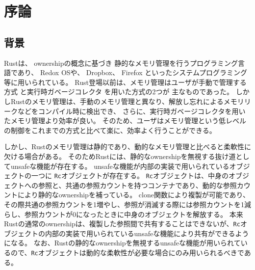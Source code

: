 \documentclass{sumiilab-paper}
\theoremstyle{mystyle}
\numberwithin{definition}{chapter} %
\begin{document}
\tableofcontents%

\mainmatter%

\chapter{序論}
\section{背景}
Rust\cite{DBLP:conf/sigada/MatsakisK14, rust-web, rust-book}は、
ownership\cite{DBLP:conf/oopsla/ClarkePN98}の概念に基づき
静的なメモリ管理を行うプログラミング言語であり、
Redox OS\cite{redox}や、
Dropbox\cite{dropbox}、
Firefox\cite{fire}
といったシステムプログラミング等に用いられている\cite{rust-web}。
Rust登場以前は、メモリ管理はユーザが手動で管理する方式
\cite{c-book}
と実行時ガベージコレクタ\cite{gc-book}
を用いた方式の2つが
主なものであった。
しかしRustのメモリ管理は、手動のメモリ管理と異なり、解放し忘れによるメモリリークなどをコンパイル時に検出でき、
さらに、実行時ガベージコレクタを用いたメモリ管理より効率が良い。
そのため、ユーザはメモリ管理という低レベルの制御をこれまでの方式と比べて楽に、効率よく行うことができる。

しかし、Rustのメモリ管理は静的であり、動的なメモリ管理と比べると柔軟性に欠ける場合がある。
そのためRustには、静的なownershipを無視する抜け道としてunsafeな機能が存在する。
unsafeな機能が内部の実装で用いられているオブジェクトの一つに
\texttt{Rc}オブジェクト\cite{rc}が存在する。
\texttt{Rc}オブジェクトは、中身のオブジェクトへの参照と、共通の参照カウントを持つコンテナであり、動的な参照カウントにより静的なownershipを補っている。
clone関数により複製が可能であり、その際共通の参照カウントを1増やし、参照が消滅する際には参照カウントを1減らし、参照カウントが0になったときに中身のオブジェクトを解放する。
本来Rustの通常のownershipは、複製した参照間で共有することはできないが、\texttt{Rc}オブジェクトの内部の実装で用いられているunsafeな機能により共有ができるようになる。
なお、Rustの静的なownershipを無視するunsafeな機能が用いられているので、\texttt{Rc}オブジェクトは動的な柔軟性が必要な場合にのみ用いられるべきである。
\end{document}
